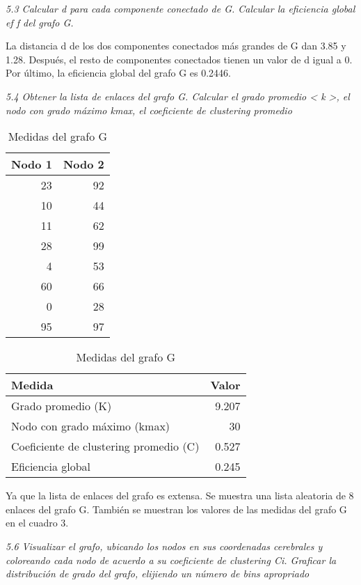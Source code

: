\documentclass{article}
\begin{document}
\textit{5.3 Calcular d para cada componente conectado de G. Calcular la eﬁciencia global ef f del
grafo G.}

La distancia d de los dos componentes conectados más grandes de G dan 3.85 y 1.28. Después,
el resto de componentes conectados tienen un valor de d igual a 0. Por último, la eficiencia
global del grafo G es 0.2446.

\textit{5.4 Obtener la lista de enlaces del grafo G. Calcular el grado promedio < k >, el nodo con grado máximo kmax, el coeﬁciente de 
clustering promedio}

\begin{table}[H]
  \begin{minipage}{0.5\linewidth}
  \centering
  \caption{Enlaces aleatorios del grafo G}
  \begin{tabular}{rr}
    \toprule
    Nodo 1 & Nodo 2 \\
    \midrule
    23 & 92 \\
    10 & 44 \\
    11 & 62 \\
    28 & 99 \\
    4 & 53 \\
    60 & 66 \\
    0 & 28 \\
    95 & 97 \\
    \bottomrule
  \end{tabular}
\end{minipage}%
\begin{minipage}{0.5\linewidth}
  \centering
  \caption{Medidas del grafo G}
  \begin{tabular}{lr}
  \toprule
  Medida & Valor \\
  \midrule
  Grado promedio (K) & 9.207 \\
  Nodo con grado máximo (kmax) & 30 \\
  Coeficiente de clustering promedio (C) & 0.527 \\
  Eficiencia global  & 0.245 \\
  \bottomrule
  \end{tabular}
\end{minipage}
\end{table}

Ya que la lista de enlaces del grafo es extensa. Se muestra una lista aleatoria de 8 enlaces 
del grafo G. También se muestran los valores de las medidas del grafo G en el cuadro 3.

\textit{5.6 Visualizar el grafo, ubicando los nodos en sus coordenadas cerebrales y coloreando cada
nodo de acuerdo a su coeﬁciente de clustering Ci. Graﬁcar la distribución de grado del grafo, elijiendo un número de bins apropriado}
\end{document}
